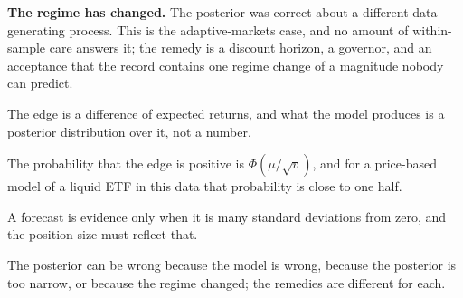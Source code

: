 \textbf{The regime has changed.} The posterior was correct about a
different data-generating process. This is the adaptive-markets case, and
no amount of within-sample care answers it; the remedy is a discount
horizon, a governor, and an acceptance that the record contains one
regime change of a magnitude nobody can predict.

\begin{keytakeaways}
\item The edge is a difference of expected returns, and what the model
produces is a posterior distribution over it, not a number.
\item The probability that the edge is positive is
\(\Phi(\mu/\sqrt{v})\), and for a price-based model of a liquid ETF in
this data that probability is close to one half.
\item A forecast is evidence only when it is many standard deviations from
zero, and the position size must reflect that.
\item The posterior can be wrong because the model is wrong, because the
posterior is too narrow, or because the regime changed; the remedies are
different for each.
\end{keytakeaways}
